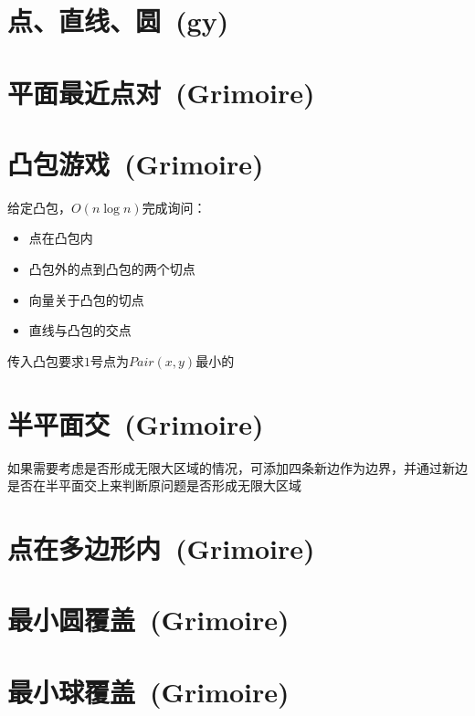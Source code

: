 \section{点、直线、圆~\small(gy)}

\section{平面最近点对~\small(Grimoire)}

\section{凸包游戏~\small(Grimoire)}
    \noindent 给定凸包，$ O(n \log n) $完成询问：
    \begin{itemize}[wide=0pt]
        \item 点在凸包内
        \item 凸包外的点到凸包的两个切点
        \item 向量关于凸包的切点
        \item 直线与凸包的交点
    \end{itemize}
    传入凸包要求$ 1 $号点为$ Pair(x, y) $最小的

\section{半平面交~\small(Grimoire)}
    如果需要考虑是否形成无限大区域的情况，可添加四条新边作为边界，并通过新边是否在半平面交上来判断原问题是否形成无限大区域

\section{点在多边形内~\small(Grimoire)}

\section{最小圆覆盖~\small(Grimoire)}

\section{最小球覆盖~\small(Grimoire)}

